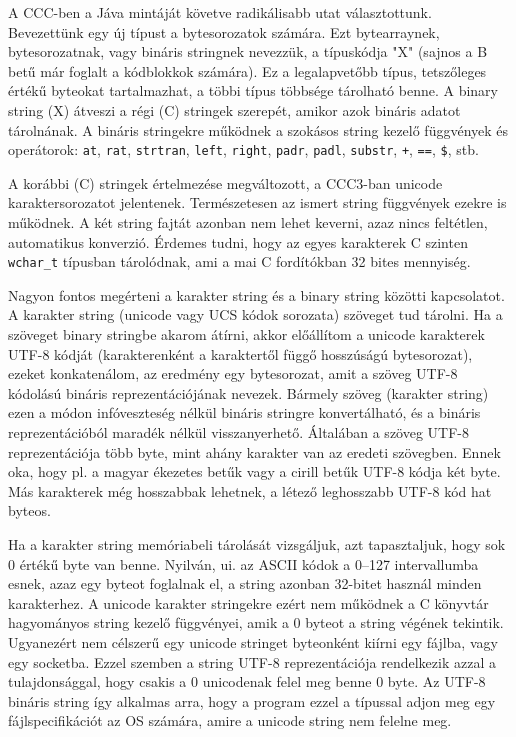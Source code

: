 A CCC-ben a Jáva mintáját követve radikálisabb utat választottunk.
Bevezettünk egy új típust a bytesorozatok számára. Ezt bytearraynek,
bytesorozatnak, vagy bináris stringnek nevezzük, a típuskódja "X"
(sajnos a B betű már foglalt a kódblokkok számára). Ez a legalapvetőbb
típus, tetszőleges értékű byteokat tartalmazhat, a többi típus 
többsége tárolható benne. A binary string (X) átveszi a régi
(C) stringek szerepét, amikor azok bináris adatot tárolnának.
A bináris stringekre működnek a szokásos string kezelő függvények
és operátorok: 
\verb!at!, 
\verb!rat!, 
\verb!strtran!, 
\verb!left!, 
\verb!right!, 
\verb!padr!, 
\verb!padl!, 
\verb!substr!, 
\verb!+!, 
\verb!==!, 
\verb!$!, 
stb.

A korábbi (C) stringek értelmezése megváltozott,
a CCC3-ban unicode karaktersorozatot jelentenek.
Természetesen az ismert string függvények ezekre is működnek.
A két string fajtát azonban nem lehet keverni, azaz nincs
feltétlen, automatikus konverzió.
Érdemes tudni, hogy az egyes karakterek C szinten \verb!wchar_t!
típusban tárolódnak, ami a mai C fordítókban 32 bites mennyiség.

Nagyon fontos megérteni a karakter string és a binary string
közötti kapcsolatot. A karakter string (unicode vagy UCS kódok
sorozata) szöveget tud tárolni. Ha a szöveget binary stringbe 
akarom átírni, akkor előállítom a unicode karakterek UTF-8
kódját (karakterenként a karaktertől függő hosszúságú bytesorozat),
ezeket konkatenálom, az eredmény egy bytesorozat, amit a 
szöveg UTF-8 kódolású bináris reprezentációjának nevezek.
Bármely szöveg (karakter string) ezen a módon infóveszteség
nélkül bináris stringre konvertálható, és a bináris reprezentációból
maradék nélkül visszanyerhető. Általában a szöveg UTF-8 reprezentációja
több byte, mint ahány karakter van az eredeti szövegben.
Ennek oka, hogy pl. a magyar ékezetes betűk vagy a cirill
betűk UTF-8 kódja két byte. Más karakterek még hosszabbak
lehetnek, a létező leghosszabb UTF-8 kód hat byteos.

Ha a karakter string memóriabeli tárolását vizsgáljuk,
azt tapasztaljuk, hogy sok 0 értékű byte van benne.
Nyilván, ui. az ASCII kódok a 0--127 intervallumba esnek,
azaz egy byteot foglalnak el, a string azonban 32-bitet 
használ minden karakterhez. A unicode karakter stringekre ezért
nem működnek a C könyvtár hagyományos string kezelő függvényei,
amik a 0 byteot a string végének tekintik. Ugyanezért nem
célszerű egy unicode stringet byteonként kiírni egy fájlba,
vagy egy socketba. Ezzel szemben a string UTF-8 reprezentációja
rendelkezik azzal a tulajdonsággal, hogy csakis a 0 unicodenak
felel meg benne 0 byte. Az UTF-8 bináris string így alkalmas
arra, hogy a program ezzel a típussal adjon meg egy fájlspecifikációt
az OS számára, amire a unicode string nem felelne meg.


